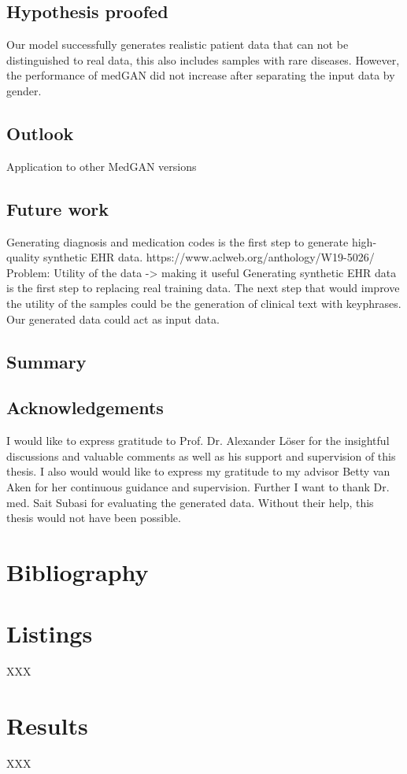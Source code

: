 \documentclass[11pt, a4paper]{book}
\begin{document}
\section{Hypothesis proofed}
Our model successfully generates realistic patient data that can not be distinguished to real data, this also includes samples with rare diseases. However, the performance of medGAN did not increase after separating the input data by gender.
\section{Outlook}
Application to other MedGAN versions

\section{Future work}
Generating diagnosis and medication codes is the first step to generate high-quality synthetic EHR data. 
https://www.aclweb.org/anthology/W19-5026/
Problem: Utility of the data -> making it useful
Generating synthetic EHR data is the first step to replacing real training data. The next step  that would improve the utility of the samples could be the generation of clinical text with keyphrases. Our generated data could act as input data.

\section{Summary}

\newpage

\section*{Acknowledgements}
I would like to express gratitude to Prof. Dr. Alexander Löser for the insightful discussions and valuable comments as well as his support and supervision of this thesis. I also would would like to express my gratitude to my advisor Betty van Aken for her continuous guidance and supervision. Further I want to thank Dr. med. Sait Subasi for evaluating the generated data. Without their help, this thesis would not have been possible.


\appendix
\renewcommand\chaptername{Appendix}

\chapter{Bibliography}

\chapter{Listings}
XXX

\chapter{Results} 
XXX
\end{document}

